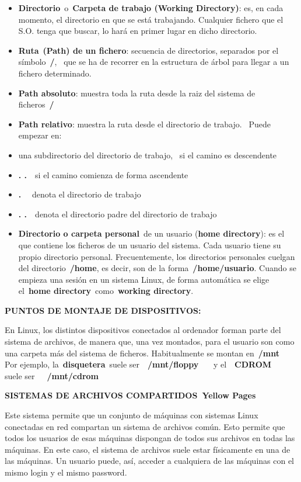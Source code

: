 \documentclass[
  letterpaper,
]{article}
\begin{document}
\begin{itemize}
\item
  \textbf{Directorio}~o~\textbf{Carpeta de trabajo (Working Directory)}:
  es, en cada momento, el directorio en que se está trabajando.
  Cualquier fichero que el S.O. tenga que buscar, lo hará en primer
  lugar en dicho directorio.
\item
  \textbf{Ruta}~\textbf{(Path) de un fichero}: secuencia de directorios,
  separados por el símbolo~\textbf{/},~ que se ha de recorrer en la
  estructura de árbol para llegar a un fichero determinado.
\item
  \textbf{Path absoluto}: muestra toda la ruta desde la raiz del sistema
  de ficheros~\textbf{/}~~
\item
  \textbf{Path relativo}: muestra la ruta desde el directorio de
  trabajo.~ Puede empezar en:
\item
  una subdirectorio del directorio de trabajo,~ si el camino es
  descendente
\item
  \textbf{. .}~~si el camino comienza de forma ascendente
\item
  \textbf{.}~~ denota el directorio de trabajo
\item
  \textbf{. .}~~denota el directorio padre del directorio de trabajo
\item
  \textbf{Directorio o carpeta personal}~de un usuario (\textbf{home
  directory}): es el que contiene los ficheros de un usuario del
  sistema. Cada usuario tiene su propio directorio personal.
  Frecuentemente, los directorios personales cuelgan del
  directorio~\textbf{/home}, es decir, son de la
  forma~\textbf{/home/usuario}. Cuando se empieza una sesión en un
  sistema Linux, de forma automática se elige el~\textbf{home
  directory}~como~\textbf{working directory}.
\end{itemize}

\textbf{PUNTOS DE MONTAJE DE DISPOSITIVOS:}

En Linux, los distintos dispositivos conectados al ordenador forman
parte del sistema de archivos, de manera que, una vez montados, para el
usuario son como una carpeta más del sistema de ficheros. Habitualmente
se montan en~\textbf{/mnt}\\
Por ejemplo, la~\textbf{disquetera}~suele ser~~\textbf{/mnt/floppy}~~~ y
el~~\textbf{CDROM}~~ suele ser~~~\textbf{/mnt/cdrom}

\textbf{SISTEMAS DE ARCHIVOS COMPARTIDOS~Yellow Pages}

Este sistema permite que un conjunto de máquinas con sistemas Linux~
conectadas en red compartan un sistema de archivos común. Esto permite
que todos los usuarios de esas máquinas dispongan de todos sus archivos
en todas las máquinas. En este caso, el sistema de archivos suele estar
físicamente en una de las máquinas. Un usuario puede, así, acceder a
cualquiera de las máquinas con el mismo login y el mismo password.
\end{document}
